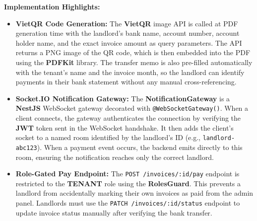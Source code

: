 \textbf{Implementation Highlights:}
\begin{itemize}
    \item \textbf{VietQR Code Generation:} The \textbf{VietQR} image API is called at PDF generation time with the landlord's bank name, account number, account holder name, and the exact invoice amount as query parameters. The API returns a PNG image of the QR code, which is then embedded into the PDF using the \textbf{PDFKit} library. The transfer memo is also pre-filled automatically with the tenant's name and the invoice month, so the landlord can identify payments in their bank statement without any manual cross-referencing.
    \item \textbf{Socket.IO Notification Gateway:} The \textbf{NotificationGateway} is a \textbf{NestJS} WebSocket gateway decorated with \texttt{@WebSocketGateway()}. When a client connects, the gateway authenticates the connection by verifying the \textbf{JWT} token sent in the WebSocket handshake. It then adds the client's socket to a named room identified by the landlord's ID (e.g., \texttt{landlord-abc123}). When a payment event occurs, the backend emits directly to this room, ensuring the notification reaches only the correct landlord.
    \item \textbf{Role-Gated Pay Endpoint:} The \texttt{POST /invoices/:id/pay} endpoint is restricted to the \textbf{TENANT} role using the \textbf{RolesGuard}. This prevents a landlord from accidentally marking their own invoices as paid from the admin panel. Landlords must use the \texttt{PATCH /invoices/:id/status} endpoint to update invoice status manually after verifying the bank transfer.
\end{itemize}

\begin{table}[H]
    \centering
    \caption{Invoice Service API Specification}
    \label{tab:invoice_api}
\end{table}

